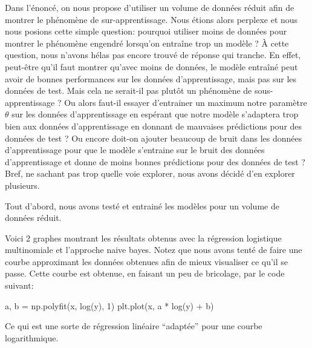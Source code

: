 \documentclass[
]{article}
\newenvironment{Shaded}{}{}
\newcommand{\DecValTok}[1]{\textcolor[rgb]{0.25,0.63,0.44}{#1}}
\newcommand{\NormalTok}[1]{#1}
\newcommand{\OperatorTok}[1]{\textcolor[rgb]{0.40,0.40,0.40}{#1}}
\begin{document}
Dans l'énoncé, on nous propose d'utiliser un volume de données réduit
afin de montrer le phénomène de sur-apprentissage. Nous étions alors
perplexe et nous nous posions cette simple question: pourquoi utiliser
moins de données pour montrer le phénomène engendré lorsqu'on entraîne
trop un modèle ? À cette question, nous n'avons hélas pas encore trouvé
de réponse qui tranche. En effet, peut-être qu'il faut montrer qu'avec
moins de données, le modèle entraîné peut avoir de bonnes performances
sur les données d'apprentissage, mais pas sur les données de test. Mais
cela ne serait-il pas plutôt un phénomène de sous-apprentissage ? Ou
alors faut-il essayer d'entrainer un maximum notre paramètre \(\theta\)
sur les données d'apprentissage en espérant que notre modèle s'adaptera
trop bien aux données d'apprentissage en donnant de mauvaises
prédictions pour des données de test ? Ou encore doit-on ajouter
beaucoup de bruit dans les données d'apprentissage pour que le modèle
s'entraine sur le bruit des données d'apprentissage et donne de moins
bonnes prédictions pour des données de test ? Bref, ne sachant pas trop
quelle voie explorer, nous avons décidé d'en explorer plusieurs.

Tout d'abord, nous avons testé et entrainé les modèles pour un volume de
données réduit.

Voici 2 graphes montrant les résultats obtenus avec la régression
logistique multinomiale et l'approche naive bayes. Notez que nous avons
tenté de faire une courbe approximant les données obtenues afin de mieux
visualiser ce qu'il se passe. Cette courbe est obtenue, en faisant un
peu de bricolage, par le code suivant:

\begin{Shaded}
\begin{Highlighting}[]
\NormalTok{a, b }\OperatorTok{=}\NormalTok{ np.polyfit(x, log(y), }\DecValTok{1}\NormalTok{)}
\NormalTok{plt.plot(x, a }\OperatorTok{*}\NormalTok{ log(y) }\OperatorTok{+}\NormalTok{ b)}
\end{Highlighting}
\end{Shaded}

Ce qui est une sorte de régression linéaire ``adaptée'' pour une courbe
logarithmique.
\end{document}

